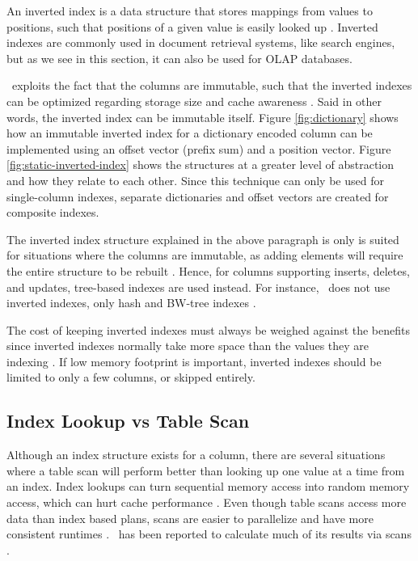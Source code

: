 An inverted index is a data structure that stores mappings from values to positions, such that positions of a given value is easily looked up \cite{Wikipedia_contributors2015-gt}. Inverted indexes are commonly used in document retrieval systems, like search engines, but as we see in this section, it can also be used for OLAP databases.

\hyrise~exploits the fact that the columns are immutable, such that the inverted indexes can be optimized regarding storage size and cache awareness \cite{Schwalb2014-hn}. Said in other words, the inverted index can be immutable itself. Figure \ref{fig:dictionary} shows how an immutable inverted index for a dictionary encoded column can be implemented using an offset vector (prefix sum) and a position vector. Figure \ref{fig:static-inverted-index} shows the structures at a greater level of abstraction and how they relate to each other. Since this technique can only be used for single-column indexes, separate dictionaries and offset vectors are created for composite indexes.

The inverted index structure explained in the above paragraph is only is suited for situations where the columns are immutable, as adding elements will require the entire structure to be rebuilt \cite{Schwalb2014-hn}. Hence, for columns supporting inserts, deletes, and updates, tree-based indexes are used instead. For instance, \mssql~does not use inverted indexes, only hash and BW-tree indexes \cite{noauthor_undated-vq, Delaney2014-ip}.

The cost of keeping inverted indexes must always be weighed against the benefits since inverted indexes normally take more space than the values they are indexing \cite{Lemke2010-is, Moffat1992-tz}. If low memory footprint is important, inverted indexes should be limited to only a few columns, or skipped entirely.

\subsection{Index Lookup vs Table Scan}
\label{sub:Index Lookup vs Table Scan}
Although an index structure exists for a column, there are several situations where a table scan will perform better than looking up one value at a time from an index. Index lookups can turn sequential memory access into random memory access, which can hurt cache performance \cite{Boncz2002-yj}. Even though table scans access more data than index based plans, scans are easier to parallelize and have more consistent runtimes \cite{Raman2008-gi}. \qlikview~has been reported to calculate much of its results via scans \cite{noauthor_undated-js}.

